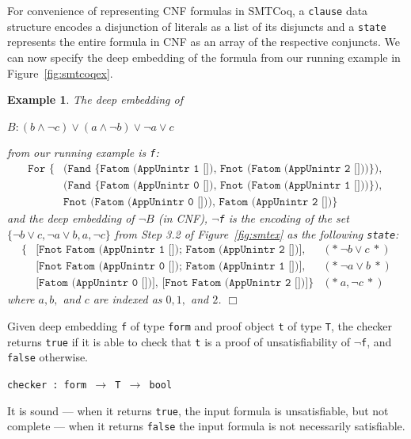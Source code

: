 \documentclass[11pt]{article}
\newtheorem{example}{Example}[section]
\newcommand{\avar}{Fatom (AppUnintr 0 [])}
\newcommand{\bvar}{Fatom (AppUnintr 1 [])}
\newcommand{\cvar}{Fatom (AppUnintr 2 [])}
\newcommand{\fnot}[1]{Fnot (#1)}
\begin{document}
	For convenience of representing 
	CNF formulas in SMTCoq, a \texttt{clause} 
	data structure encodes a disjunction of 
	literals as a list of its disjuncts
	and a \texttt{state} represents the entire 
	formula in CNF as an array of the 
	respective conjuncts. We can now 
	specify the deep embedding of the 
	formula from our running example in 
	Figure~\ref{fig:smtcoqex}.
	
	\begin{example}
		\label{ex:deep}
		\em The deep embedding of 
		\begin{center}
			$B: (b \land \neg c) \lor 
			(a \land \neg b) \lor \neg a 
			\lor c$
		\end{center}
		from our running example is \texttt{f}:
		\begin{align*}
			\texttt{For \{}
				&\texttt{(Fand \{\bvar,\ \fnot{\cvar}\}), }\\
				&\texttt{(Fand \{\avar,\ \fnot{\bvar}\}), }\\
				&\texttt{\fnot \avar, \cvar\}}
		\end{align*}
		and the deep embedding of $\neg B$ 
		(in CNF), \texttt{$\neg$f} is the 
		encoding of the set 
		$\{\neg b \lor c, \neg a \lor b, a, 
		\neg c\}$ from Step 3.2 of 
		Figure~\ref{fig:smtex} 
		as the following \texttt{state}:
		\begin{align*}
			\{&\texttt{[Fnot Fatom 
			(AppUnintr 1 []); 
			Fatom (AppUnintr 2 [])],} 
			&(*\ \neg b \lor c\ *)\\
			&\texttt{[Fnot Fatom 
			(AppUnintr 0 []); Fatom 
			(AppUnintr 1 [])],} &(*\ 
			\neg a \lor b\ *)\\
			&\texttt{[Fatom (AppUnintr 0 
			[])], [Fnot Fatom (AppUnintr 
			2 [])]}\} &(*\ a, \neg c\ *)  
		\end{align*}
		where $a, b,$ and $c$ are indexed 
		as $0, 1,$ and $2$. \hfill $\Box$
	\end{example}

	Given deep embedding 
	\texttt{f} of type \texttt{form}
	and proof object \texttt{t} of type 
	\texttt{T}, the checker returns 
	\texttt{true} if it is able to 
	check that \texttt{t} is a proof
	of unsatisfiability of \texttt{$\neg$f},
	and \texttt{false} otherwise.
	\begin{center}
		\texttt{checker : form 
			$\to$ T $\to$ bool}	
	\end{center}
	It is sound --- when 
	it returns \texttt{true}, the
	input formula is unsatisfiable, 
	but not complete --- when it 
	returns \texttt{false} the 
	input formula is not necessarily 
	satisfiable. 
	
\end{document}
